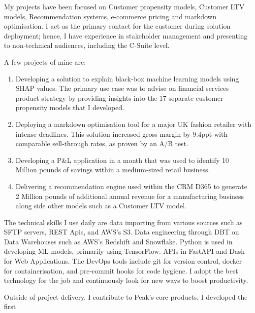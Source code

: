 \documentclass[12pt, a4paper]{awesome-cv}
\begin{document}
\begin{cventries}

{\begin{cvitems}
\item {
  My projects have been focused on Customer propensity models, Customer LTV models, Recommendation systems, e‑commerce pricing and markdown optimisation.
  I act as the primary contact for the customer during solution deployment;   hence, I have experience in stakeholder management and presenting to non‑technical audiences,
  including the C‑Suite level.
}
\item{A few projects of mine are:
  \begin{enumerate}
    \item  Developing a solution to explain black‑box machine learning models using SHAP values. The primary use
    case was to advise on financial services product strategy by providing insights into the 17 separate
    customer propensity models that I developed.
    \item Deploying a markdown optimisation tool for a major UK fashion retailer with intense deadlines.
    This solution increased gross margin by 9.4ppt with comparable sell‑through rates, as proven by an A/B test.
    \item  Developing a P\&L application in a month that was used to identify 10 Million pounds of savings
    within a medium‑sized retail business.
    \item  Delivering a recommendation engine used within the CRM D365 to generate 2 Million pounds of additional
    annual revenue for a manufacturing business along side other models such as a Customer LTV model.
  \end{enumerate}
}
\item {The technical skills I use daily are data importing from various sources such as SFTP servers, REST Apis, and AWS's S3.
  Data engineering through DBT on Data Warehouses such as AWS's Redshift and Snowflake. Python is used in developing ML
  models, primarily using TensorFlow. APIs in FastAPI and Dash for Web Applications. The DevOps tools include git for version
  control, docker for containerisation, and pre‑commit hooks for code hygiene. I adopt the best technology
  for the job and continuously look for new ways to boost productivity.
}
\item {Outside of project delivery, I contribute to Peak's core products. I developed the first
}
\end{cvitems}}
\end{cventries}
\end{document}
